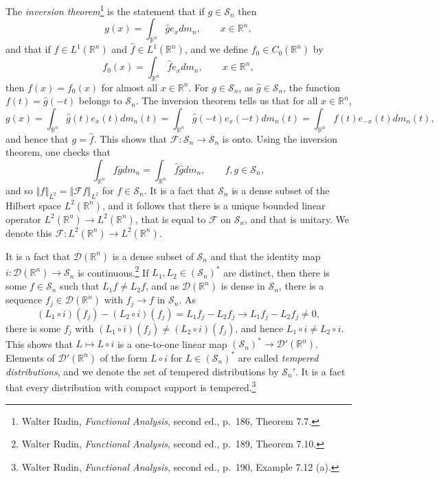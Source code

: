 \documentclass{article}
\newcommand{\norm}[1]{\left\Vert #1 \right\Vert}
\theoremstyle{definition}
\begin{document}
The {\em  inversion theorem}\footnote{Walter Rudin, {\em Functional Analysis},
second ed., p.~186, Theorem 7.7.} is the statement that if
 $g \in \mathscr{S}_n$ then
\[
g(x) = \int_{\mathbb{R}^n} \hat{g}e_x dm_n, \qquad x \in \mathbb{R}^n,
\]
and that if
$f \in L^1(\mathbb{R}^n)$ and $\hat{f} \in L^1(\mathbb{R}^n)$,  and we define $f_0 \in C_0(\mathbb{R}^n)$  by 
\[
f_0(x) = \int_{\mathbb{R}^n} \hat{f} e_x dm_n, \qquad x \in \mathbb{R}^n,
\]
then $f(x)=f_0(x)$ for almost all $x \in \mathbb{R}^n$. For $g \in \mathscr{S}_n$,
as $\hat{g} \in \mathscr{S}_n$, the function
$f(t)=\hat{g}(-t)$ belongs to $\mathscr{S}_n$. The inversion theorem tells us that for all $x \in \mathbb{R}^n$,
\[
g(x) = \int_{\mathbb{R}^n} \hat{g}(t) e_x(t) dm_n(t) = \int_{\mathbb{R}^n} \hat{g}(-t) e_x(-t) dm_n(t) 
=\int_{\mathbb{R}^n} f(t) e_{-x}(t) dm_n(t),
\]
and hence that $g=\hat{f}$. 
This shows that $\mathscr{F}:\mathscr{S}_n \to \mathscr{S}_n$ is onto.
Using the inversion theorem, one checks that 
\[
\int_{\mathbb{R}^n} f\overline{g} dm_n = \int_{\mathbb{R}^n} \hat{f} \overline{\hat{g}} dm_n,
\qquad f,g \in \mathscr{S}_n,
\]
and so $\norm{f}_{L^2} = \norm{\mathscr{F}f}_{L^2}$ for $f \in \mathscr{S}_n$. It is a fact that
$\mathscr{S}_n$ is a dense subset of the Hilbert space $L^2(\mathbb{R}^n)$, and it follows that there is a unique bounded
linear operator $L^2(\mathbb{R}^n) \to L^2(\mathbb{R}^n)$, that is equal to $\mathscr{F}$ on $\mathscr{S}_n$, and that is unitary.
We denote this  $\mathscr{F}:L^2(\mathbb{R}^n) \to L^2(\mathbb{R}^n)$. 

It is a fact that $\mathscr{D}(\mathbb{R}^n)$ is a dense subset of $\mathscr{S}_n$ and that
the identity map $i:\mathscr{D}(\mathbb{R}^n) \to \mathscr{S}_n$ is continuous.\footnote{Walter Rudin, {\em Functional Analysis},
second ed., p.~189, Theorem 7.10.} If $L_1,L_2 \in (\mathscr{S}_n)^*$  are distinct, then there is some $f \in \mathscr{S}_n$ such that
$L_1 f \neq L_2 f$, and as $\mathscr{D}(\mathbb{R}^n)$ is dense in $\mathscr{S}_n$, there is a sequence $f_j \in \mathscr{D}(\mathbb{R}^n)$
with $f_j \to f$ in $\mathscr{S}_n$. As
\[
(L_1 \circ i)(f_j) - (L_2 \circ i)(f_j) =  L_1 f_j - L_2 f_j \to L_1 f_j -L_2 f_j \neq 0,
\]
there is some $f_j$ with $(L_1 \circ i)(f_j) \neq (L_2 \circ i)(f_j)$, and hence $L_1 \circ i \neq L_2 \circ i$. This shows that
$L \mapsto L \circ i$ is a one-to-one linear map $(\mathscr{S}_n)^* \to \mathscr{D}'(\mathbb{R}^n)$. 
Elements of $\mathscr{D}'(\mathbb{R}^n)$ of the form $L \circ i$ for $L \in (\mathscr{S}_n)^*$ are called
{\em tempered distributions}, and we denote the set of tempered distributions by
$\mathscr{S}_n'$.
It is a fact that every distribution with compact support is tempered.\footnote{Walter Rudin, {\em Functional Analysis}, second ed., p.~190, Example 7.12 (a).}
\end{document}
